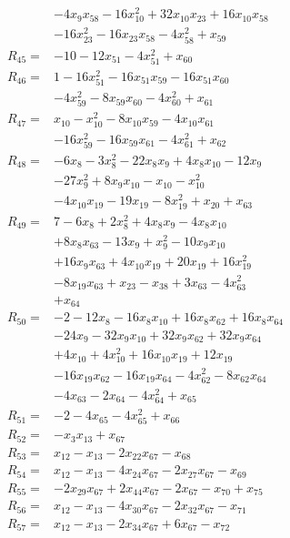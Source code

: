 \begin{align*}
&-4x_{9}x_{58} -16x_{10}^{2} +32x_{10}x_{23} +16x_{10}x_{58}\\
&-16x_{23}^{2} -16x_{23}x_{58} -4x_{58}^{2} +x_{59}\\[3pt]
R_{45}={}&-10 -12x_{51} -4x_{51}^{2} +x_{60}\\[3pt]
R_{46}={}&1 -16x_{51}^{2} -16x_{51}x_{59} -16x_{51}x_{60}\\
&-4x_{59}^{2} -8x_{59}x_{60} -4x_{60}^{2} +x_{61}\\[3pt]
R_{47}={}&x_{10} -x_{10}^{2} -8x_{10}x_{59} -4x_{10}x_{61}\\
&-16x_{59}^{2} -16x_{59}x_{61} -4x_{61}^{2} +x_{62}\\[3pt]
R_{48}={}&-6x_{8} -3x_{8}^{2} -22x_{8}x_{9} +4x_{8}x_{10} -12x_{9}\\
&-27x_{9}^{2} +8x_{9}x_{10} -x_{10} -x_{10}^{2}\\
&-4x_{10}x_{19} -19x_{19} -8x_{19}^{2} +x_{20} +x_{63}\\[3pt]
R_{49}={}&7 -6x_{8} +2x_{8}^{2} +4x_{8}x_{9} -4x_{8}x_{10}\\
&+8x_{8}x_{63} -13x_{9} +x_{9}^{2} -10x_{9}x_{10}\\
&+16x_{9}x_{63} +4x_{10}x_{19} +20x_{19} +16x_{19}^{2}\\
&-8x_{19}x_{63} +x_{23} -x_{38} +3x_{63} -4x_{63}^{2}\\
&+x_{64}\\[3pt]
R_{50}={}&-2 -12x_{8} -16x_{8}x_{10} +16x_{8}x_{62} +16x_{8}x_{64}\\
&-24x_{9} -32x_{9}x_{10} +32x_{9}x_{62} +32x_{9}x_{64}\\
&+4x_{10} +4x_{10}^{2} +16x_{10}x_{19} +12x_{19}\\
&-16x_{19}x_{62} -16x_{19}x_{64} -4x_{62}^{2} -8x_{62}x_{64}\\
&-4x_{63} -2x_{64} -4x_{64}^{2} +x_{65}\\[3pt]
R_{51}={}&-2 -4x_{65} -4x_{65}^{2} +x_{66}\\[3pt]
R_{52}={}&-x_{3}x_{13} +x_{67}\\[3pt]
R_{53}={}&x_{12} -x_{13} -2x_{22}x_{67} -x_{68}\\[3pt]
R_{54}={}&x_{12} -x_{13} -4x_{24}x_{67} -2x_{27}x_{67} -x_{69}\\[3pt]
R_{55}={}&-2x_{29}x_{67} +2x_{44}x_{67} -2x_{67} -x_{70} +x_{75}\\[3pt]
R_{56}={}&x_{12} -x_{13} -4x_{30}x_{67} -2x_{32}x_{67} -x_{71}\\[3pt]
R_{57}={}&x_{12} -x_{13} -2x_{34}x_{67} +6x_{67} -x_{72}\\[3pt]

\end{align*}
